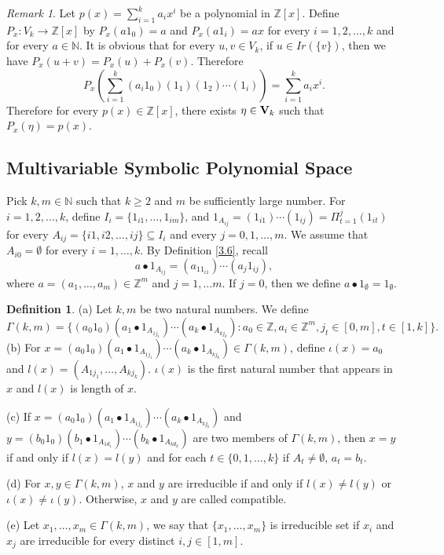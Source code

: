 \documentclass{amsart}
\theoremstyle{definition}
\newtheorem{definition}[theorem]{Definition}
\theoremstyle{remark}
\newtheorem{remark}[theorem]{Remark}
\numberwithin{equation}{section}
\newcommand{\V}{{\bf{V}}}
\begin{document}
\begin{remark}
	Let $p(x)=\sum_{i=1}^ka_ix^i$ be a polynomial in $\mathbb{Z}[x]$.  Define $P_x:V_k\to \mathbb{Z}[x]$ by $P_x(a1_0)=a$ and $P_x(a1_i)=ax$ for every $i=1,2,\ldots,k$ and for every $a\in \mathbb{N}$. It is obvious that for every $u,v\in V_k$, if $u\in Ir(\{v\})$, then we have $P_x(u+v)=P_x(u)+P_x(v)$. Therefore
	\[
	P_x(\sum_{i=1}^k(a_i1_0)(1_1)(1_2)\cdots(1_i))=\sum_{i=1}^ka_ix^i.
	\]
	Therefore for every $p(x)\in\mathbb{Z}[x]$, there exists $\eta\in \V_k$ such that $P_x(\eta)=p(x)$.
\end{remark}


\subsection{Multivariable Symbolic Polynomial Space}

Pick \( k,m \in \mathbb{N} \) such that $k\geq 2$ and $m$ be sufficiently large number. For $i=1,2,\ldots,k$, define \( I_i=\{ 1_{i1}, \ldots, 1_{im}\} \), and $1_{A_{ij}}=(1_{i1})\cdots(1_{ij})=\Pi_{t=1}^j(1_{it})$ for every $A_{ij}=\{i1,i2,\ldots,ij\}\subseteq I_i$ and every $j=0,1,\ldots,m$. We assume that $A_{i0}=\emptyset$ for every $i=1,\ldots,k$. By Definition \ref{3.6}, recall
\[
a\bullet 1_{A_{ij}}=(a_11_{i1})\cdots(a_j1_{ij}),
\]
where $a=(a_1,\ldots,a_m)\in\mathbb{Z}^m$ and $j=1,\ldots m$. If $j=0$, then we define $a\bullet 1_\emptyset=1_\emptyset$.
\begin{definition} 
	(a) Let $k,m$ be two natural numbers. We define
	\[ 
	\Gamma(k,m) = \{ (a_0 1_0)(a_1\bullet 1_{A_{1j_1}})\cdots(a_k\bullet 1_{A_{kj_k}}):a_0\in\mathbb{Z}, a_i\in\mathbb{Z}^m,j_t\in [0,m],t\in[1,k]\}.
	\]
	(b) For \( x = (a_0 1_0)(a_1\bullet 1_{A_{1j_1}})\cdots(a_k\bullet 1_{A_{kj_k}}) \in \Gamma(k,m)\), define \( \iota(x) = a_0 \) and \( l(x) = (A_{1j_1},\ldots,A_{kj_k}) \). $\iota(x)$ is the first natural number that appears in $x$ and $l(x)$ is length of $x$.
	
	(c) If \( x = (a_0 1_0)(a_1\bullet 1_{A_{1j_1}})\cdots(a_k\bullet 1_{A_{kj_k}}) \) and \( y = (b_0 1_0)(b_1\bullet 1_{A_{1d_1}})\cdots(b_k\bullet 1_{A_{kd_k}}) \) are two members of \( \Gamma(k,m) \), then 
	$x = y $ if and only if $l(x)=l(y)$ and for each  $t \in \{0, 1, \ldots, k\}$ if $A_t\neq\emptyset$, $a_t = b_t$.
	
	(d) For \( x, y \in \Gamma(k,m) \), $ x $ and $y$ are irreducible if and only if  $l(x)\neq l(y)$  or \( \iota(x)\neq\iota(y) \). Otherwise, $x$ and $y$ are called compatible. 
	
	(e) Let $x_1,\ldots,x_m\in \Gamma(k,m)$, we say that $\{x_1,\ldots,x_m\}$ is irreducible set if $x_i$ and $x_j$ are irreducible for every distinct $i,j\in [1,m]$. 
	
%	
\end{definition} 
\end{document}
